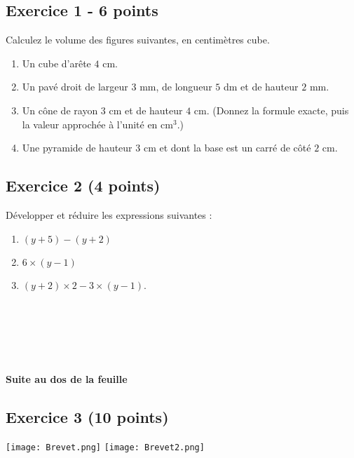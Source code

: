 \documentclass[14 pt]{extarticle}
\theoremstyle{plain}
\begin{document}
\subsection*{Exercice 1 - 6 points}	%
Calculez le volume des figures suivantes, en centimètres cube. \begin{enumerate}
\item Un cube d'arête $4$ cm. 
\item Un pavé droit de largeur $3$ mm, de longueur $5$ dm et de hauteur $2$ mm. 
\item Un cône de rayon $3$ cm et de hauteur $4$ cm. (Donnez la formule exacte, puis la valeur approchée à l'unité en $\mathrm{cm}^3$.)
\item Une pyramide de hauteur $3$ cm et dont la base est un carré de côté $2$ cm. 

\end{enumerate}

\subsection*{Exercice 2 (4 points)} %
 Développer et réduire les expressions suivantes :\begin{enumerate}
 \item $ (y+5) - (y+2)$
 \item $6 \times (y-1) $
 \item $(y+2) \times 2 - 3\times (y-1)$. 
\end{enumerate}    

\ \ \ 


\ \ \ 


\ \ \ 

\textbf{Suite au dos de la feuille}
  
  \subsection*{Exercice 3 (10 points)}

\texttt{[image: Brevet.png]} 
\texttt{[image: Brevet2.png]} 
 	
\end{document}
